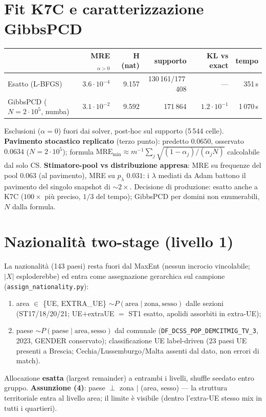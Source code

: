 \documentclass[11pt,a4paper]{article}
\newcommand{\code}[1]{\texttt{#1}}
\newcommand{\flow}[1]{\texttt{\small #1}}
\begin{document}
\section{Fit K7C e caratterizzazione GibbsPCD}
\begin{center}
\small
\begin{tabular}{@{}lrrrrr@{}}
\toprule
 & \textbf{MRE}$_{\alpha>0}$ & \textbf{H (nat)} & \textbf{supporto} & \textbf{KL vs exact} & \textbf{tempo}\\
\midrule
Esatto (L-BFGS) & $3.6\cdot10^{-4}$ & 9.157 & 130\,161/177\,408 & --- & 351\,s\\
GibbsPCD ($N{=}2\cdot10^5$, numba) & $3.1\cdot10^{-2}$ & 9.592 & 171\,864 & $1.2\cdot10^{-1}$ & 1\,070\,s\\
\bottomrule
\end{tabular}
\end{center}
Esclusioni ($\alpha=0$) fuori dai solver, post-hoc sul supporto (5\,544
celle). \textbf{Pavimento stocastico replicato} (terzo punto):
predetto $0.0650$, osservato $0.0634$ ($N=2\cdot10^5$); formula
$\text{MRE}_{\min}\approx m^{-1}\sum_j\sqrt{(1-\alpha_j)/(\alpha_j N)}$
calcolabile dal solo CS. \textbf{Stimatore-pool vs distribuzione appresa}:
MRE su frequenze del pool $0.063$ (al pavimento), MRE su $p_\lambda$
$0.031$: i $\lambda$ mediati da Adam battono il pavimento del singolo
snapshot di $\sim2\times$. Decisione di produzione: esatto anche a K7C
($100\times$ pi\`u preciso, $1/3$ del tempo); GibbsPCD per domini non
enumerabili, $N$ dalla formula.

\section{Nazionalit\`a two-stage (livello 1)}
\label{sec:naz}
La nazionalit\`a (143 paesi) resta fuori dal MaxEnt (nessun incrocio
vincolabile; $|X|$ esploderebbe) ed entra come assegnazione gerarchica sul
campione (\code{assign\_nationality.py}):
\begin{enumerate}[leftmargin=*,itemsep=1pt]
  \item[(2a)] area $\in$ \{UE, EXTRA\_UE\} $\sim P(\text{area}\mid
  \text{zona},\text{sesso})$ dalle sezioni (ST17/18/20/21; UE$+$extraUE
  $=$ ST1 esatto, apolidi assorbiti in extra-UE);
  \item[(2b)] paese $\sim P(\text{paese}\mid\text{area},\text{sesso})$ dal
  comunale (\flow{DF\_DCSS\_POP\_DEMCITMIG\_TV\_3}, 2023, GENDER
  conservato); classificazione UE label-driven (23 paesi UE presenti a
  Brescia; Cechia/Lussemburgo/Malta assenti dal dato, non errori di match).
\end{enumerate}
Allocazione \textbf{esatta} (largest remainder) a entrambi i livelli, shuffle
seedato entro gruppo. \textbf{Assunzione (4)}: paese $\perp$ zona $\mid$
(area, sesso) --- la struttura territoriale entra al livello area; il limite
\`e visibile (dentro l'extra-UE stesso mix in tutti i quartieri).
\end{document}
